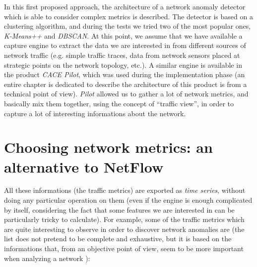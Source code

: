 \documentclass[12pt,a4paper,cucitura]{toptesi}
\begin{document}
In this first proposed approach, the architecture of a network anomaly detector which is able to consider complex metrics is described.
The detector is based on a clustering algorithm, and during the tests we tried two of the most popular ones, \emph{K-Means++} and \emph{DBSCAN}.
At this point, we assume that we have available a capture engine to extract the data we are interested in from different sources of network traffic (e.g. simple traffic traces, data from network sensors placed at strategic points on the network topology, etc.).
A similar engine is available in the product \emph{CACE Pilot}, which was used during the implementation phase (an entire chapter is dedicated to describe the architecture of this product is from a technical point of view).
\emph{Pilot} allowed us to gather a lot of network metrics, and basically mix them together, using the concept of ``traffic view'', in order to capture a lot of interesting informations about the network.

\section{Choosing network metrics: an alternative to NetFlow}

All these informations (the traffic metrics) are exported as \emph{time series}, without doing any particular operation on them (even if the engine is enough complicated by itself, considering the fact that some features we are interested in can be particularly tricky to calculate).
For example, some of the traffic metrics which are quite interesting to observe in order to discover network anomalies are (the list does not pretend to be complete and exhaustive, but it is based on the informations that, from an objective point of view, seem to be more important when analyzing a network \cite{ntop}):
\end{document}
